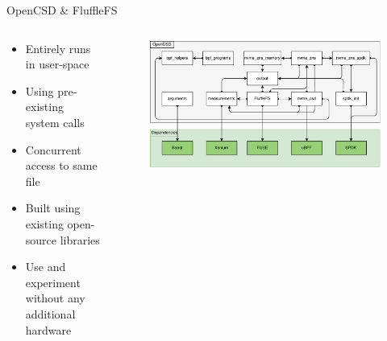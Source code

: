 \documentclass[aspectratio=169, notes]{beamer}
\begin{document}
\begin{frame}{OpenCSD \& FluffleFS}
    \begin{columns}
        \begin{column}{0.45\textwidth}
            \footnotesize
            \begin{itemize}
                \item Entirely runs in user-space
                \item Using pre-existing system calls
                \item Concurrent access to same file
                \item Built using existing open-source libraries
                \item Use and experiment without any additional hardware
            \end{itemize}
        \end{column}
        \begin{column}{0.55\textwidth}
            \begin{figure}
                \centering
                \includegraphics[width=1\textwidth]{resources/images/module-dependencies.pdf}
            \end{figure}
        \end{column}
    \end{columns}
\end{frame}
\end{document}
